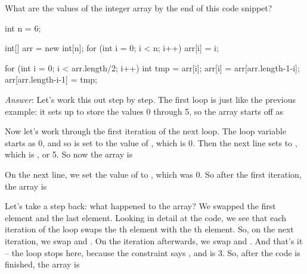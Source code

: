 \begin{example}
What are the values of the integer array  by the end of this code snippet? 
\begin{code}
    int n = 6;
    
    int[] arr = new int[n];
    for (int i = 0; i < n; i++) {
      arr[i] = i;
    }

    for (int i = 0; i < arr.length/2; i++) {
      int tmp = arr[i];
      arr[i] = arr[arr.length-1-i];
      arr[arr.length-i-1] = tmp;
    }
\end{code}

\noindent \emph{Answer}:
Let's work this out step by step. The first  loop is just like the previous example: it sets up  to store the values 0 through 5, so the array starts off as
\begin{center}
\end{center}
Now let's work through the first iteration of the next  loop. The loop variable  starts as 0, and so  is set to the value of , which is 0. Then the next line sets  to , which is , or 5. So now the array is
\begin{center}
\end{center}
On the next line, we set the value of  to , which was 0. So after the first iteration, the array is
\begin{center}
\end{center}
Let's take a step back: what happened to the array? We swapped the first element and the last element. Looking in detail at the code, we see that each iteration of the loop swaps the th element with the th element. So, on the next iteration, we swap  and . On the iteration afterwards, we swap  and . And that's it -- the  loop stops here, because the constraint says , and  is 3. So, after the code is finished, the array is
\begin{center}
\end{center}
\end{example}

